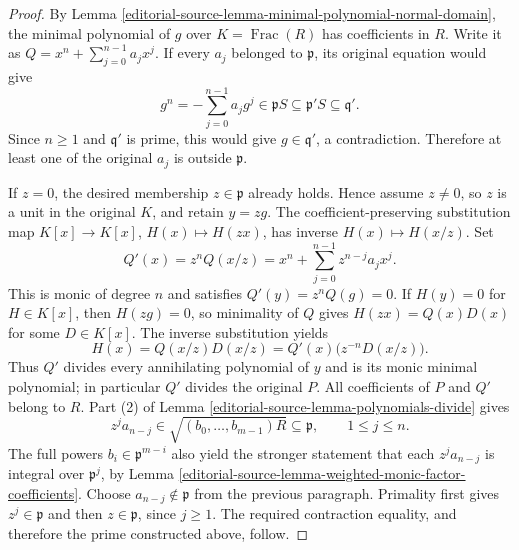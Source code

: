 \begin{proof}
\medskip\noindent
By Lemma \ref{editorial-source-lemma-minimal-polynomial-normal-domain}, the
minimal polynomial of $g$ over $K=\operatorname{Frac}(R)$ has
coefficients in $R$. Write it as
$Q=x^n+\sum_{j=0}^{n-1}a_jx^j$. If every $a_j$ belonged to
$\mathfrak p$, its original equation would give
$$
g^n=-\sum_{j=0}^{n-1}a_jg^j\in\mathfrak pS
\subseteq\mathfrak p'S\subseteq\mathfrak q'.
$$
Since $n\geq1$ and $\mathfrak q'$ is prime, this would give
$g\in\mathfrak q'$, a contradiction. Therefore at least one
of the original $a_j$ is outside $\mathfrak p$.

\medskip\noindent
If $z=0$, the desired membership $z\in\mathfrak p$ already
holds. Hence assume $z\ne0$, so $z$ is a unit in the original
$K$, and retain $y=zg$. The coefficient-preserving substitution
map $K[x]\to K[x]$, $H(x)\mapsto H(zx)$, has inverse
$H(x)\mapsto H(x/z)$. Set
$$
Q'(x)=z^nQ(x/z)
=x^n+\sum_{j=0}^{n-1}z^{n-j}a_jx^j.
$$
This is monic of degree $n$ and satisfies
$Q'(y)=z^nQ(g)=0$. If $H(y)=0$ for $H\in K[x]$, then
$H(zg)=0$, so minimality of $Q$ gives $H(zx)=Q(x)D(x)$
for some $D\in K[x]$. The inverse substitution yields
$$
H(x)=Q(x/z)D(x/z)=Q'(x)\bigl(z^{-n}D(x/z)\bigr).
$$
Thus $Q'$ divides every annihilating polynomial of $y$ and is
its monic minimal polynomial; in particular $Q'$ divides the
original $P$. All coefficients of $P$ and $Q'$ belong to $R$.
Part (2) of Lemma \ref{editorial-source-lemma-polynomials-divide} gives
$$
z^ja_{n-j}\in\sqrt{(b_0,\ldots,b_{m-1})R}
\subseteq\mathfrak p,\qquad 1\leq j\leq n.
$$
The full powers $b_i\in\mathfrak p^{m-i}$ also yield the
stronger statement that each $z^ja_{n-j}$ is integral over
$\mathfrak p^j$, by
Lemma \ref{editorial-source-lemma-weighted-monic-factor-coefficients}.
Choose $a_{n-j}\notin\mathfrak p$ from the previous paragraph.
Primality first gives $z^j\in\mathfrak p$ and then
$z\in\mathfrak p$, since $j\geq1$. The required contraction
equality, and therefore the prime constructed above, follow.
\end{proof}